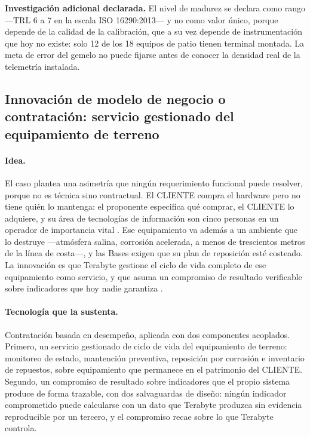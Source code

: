 \begin{bloqueDuda}
\textbf{Investigación adicional declarada.} El nivel de madurez se declara como
rango —TRL 6 a 7 en la escala ISO 16290:2013— y no como valor único, porque
depende de la calidad de la calibración, que a su vez depende de
instrumentación que hoy no existe: solo 12 de los 18 equipos de patio tienen
terminal montada. La meta de error del gemelo no puede fijarse antes de conocer
la densidad real de la telemetría instalada.
\end{bloqueDuda}

\subsection{Innovación de modelo de negocio o contratación: servicio gestionado
del equipamiento de terreno}

\paragraph*{Idea.}
El caso plantea una asimetría que ningún requerimiento funcional puede
resolver, porque no es técnica sino contractual. El CLIENTE compra el hardware
pero no tiene quién lo mantenga: el proponente especifica qué comprar, el
CLIENTE lo adquiere, y su área de tecnologías de información son cinco personas
en un operador de importancia vital \Hecho. Ese equipamiento va además a un
ambiente que lo destruye —atmósfera salina, corrosión acelerada, a menos de
trescientos metros de la línea de costa—, y las Bases exigen que su plan de
reposición esté costeado. La innovación es que Terabyte gestione el ciclo de
vida completo de ese equipamiento como servicio, y que asuma un compromiso de
resultado verificable sobre indicadores que hoy nadie garantiza \Propuesta.

\paragraph*{Tecnología que la sustenta.}
Contratación basada en desempeño, aplicada con dos componentes acoplados.
Primero, un servicio gestionado de ciclo de vida del equipamiento de terreno:
monitoreo de estado, mantención preventiva, reposición por corrosión e
inventario de repuestos, sobre equipamiento que permanece en el patrimonio del
CLIENTE. Segundo, un compromiso de resultado sobre indicadores que el propio
sistema produce de forma trazable, con dos salvaguardas de diseño: ningún
indicador comprometido puede calcularse con un dato que Terabyte produzca sin
evidencia reproducible por un tercero, y el compromiso recae sobre lo que
Terabyte controla.

